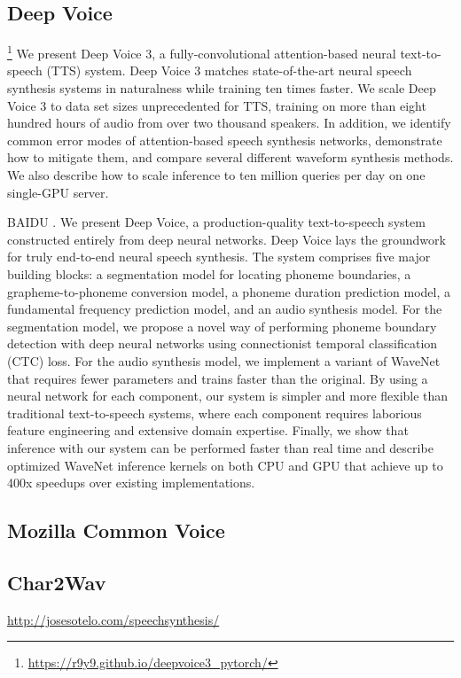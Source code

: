 \subsection{Deep Voice}
\footnote{\url{https://r9y9.github.io/deepvoice3_pytorch/}}
We present Deep Voice 3, a fully-convolutional attention-based neural text-to-speech (TTS) system. Deep Voice 3 matches state-of-the-art neural speech synthesis systems in naturalness while training ten times faster. We scale Deep Voice 3 to data set sizes unprecedented for TTS, training on more than eight hundred hours of audio from over two thousand speakers. In addition, we identify common error modes of attention-based speech synthesis networks, demonstrate how to mitigate them, and compare several different waveform synthesis methods. We also describe how to scale inference to ten million queries per day on one single-GPU server. 


BAIDU \cite{Arik2017DeepVR}.
We present Deep Voice, a production-quality text-to-speech system constructed entirely from deep neural networks. Deep Voice lays the groundwork for truly end-to-end neural speech synthesis. The system comprises five major building blocks: a segmentation model for locating phoneme boundaries, a grapheme-to-phoneme conversion model, a phoneme duration prediction model, a fundamental frequency prediction model, and an audio synthesis model. For the segmentation model, we propose a novel way of performing phoneme boundary detection with deep neural networks using connectionist temporal classification (CTC) loss. For the audio synthesis model, we implement a variant of WaveNet that requires fewer parameters and trains faster than the original. By using a neural network for each component, our system is simpler and more flexible than traditional text-to-speech systems, where each component requires laborious feature engineering and extensive domain expertise. Finally, we show that inference with our system can be performed faster than real time and describe optimized WaveNet inference kernels on both CPU and GPU that achieve up to 400x speedups over existing implementations. 

\subsection{Mozilla Common Voice}

\subsection{Char2Wav}
\url{http://josesotelo.com/speechsynthesis/}

